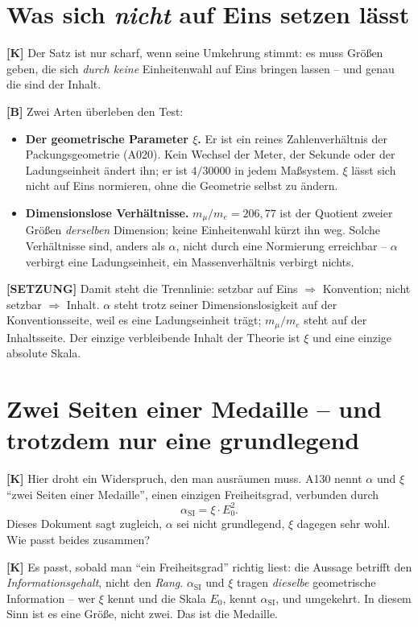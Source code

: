 \section{Was sich \emph{nicht} auf Eins setzen lässt}

\textbf{[K]} Der Satz ist nur scharf, wenn seine Umkehrung stimmt: es muss
Größen geben, die sich \emph{durch keine} Einheitenwahl auf Eins bringen lassen
-- und genau die sind der Inhalt.

\textbf{[B]} Zwei Arten überleben den Test:
\begin{itemize}
  \item \textbf{Der geometrische Parameter $\xi$.} Er ist ein reines
    Zahlenverhältnis der Packungsgeometrie (A020). Kein Wechsel der Meter, der
    Sekunde oder der Ladungseinheit ändert ihn; er ist $4/30000$ in jedem
    Maßsystem. $\xi$ lässt sich nicht auf Eins normieren, ohne die Geometrie
    selbst zu ändern.
  \item \textbf{Dimensionslose Verhältnisse.} $m_\mu/m_e = 206{,}77$ ist der
    Quotient zweier Größen \emph{derselben} Dimension; keine Einheitenwahl kürzt
    ihn weg. Solche Verhältnisse sind, anders als $\alpha$, nicht durch eine
    Normierung erreichbar -- $\alpha$ verbirgt eine Ladungseinheit, ein
    Massenverhältnis verbirgt nichts.
\end{itemize}

\textbf{[SETZUNG]} Damit steht die Trennlinie: setzbar auf Eins $\Rightarrow$
Konvention; nicht setzbar $\Rightarrow$ Inhalt. $\alpha$ steht trotz seiner
Dimensionslosigkeit auf der Konventionsseite, weil es eine Ladungseinheit trägt;
$m_\mu/m_e$ steht auf der Inhaltsseite. Der einzige verbleibende Inhalt der
Theorie ist $\xi$ und eine einzige absolute Skala.

\section{Zwei Seiten einer Medaille -- und trotzdem nur eine grundlegend}

\textbf{[K]} Hier droht ein Widerspruch, den man ausräumen muss. A130 nennt
$\alpha$ und $\xi$ \enquote{zwei Seiten einer Medaille}, einen einzigen
Freiheitsgrad, verbunden durch
\[
  \alpha_\text{SI} = \xi\cdot E_0^2 .
\]
Dieses Dokument sagt zugleich, $\alpha$ sei nicht grundlegend, $\xi$ dagegen
sehr wohl. Wie passt beides zusammen?

\textbf{[K]} Es passt, sobald man \enquote{ein Freiheitsgrad} richtig liest: die
Aussage betrifft den \emph{Informationsgehalt}, nicht den \emph{Rang}. $\alpha_\text{SI}$
und $\xi$ tragen \emph{dieselbe} geometrische Information -- wer $\xi$ kennt und
die Skala $E_0$, kennt $\alpha_\text{SI}$, und umgekehrt. In diesem Sinn ist es
eine Größe, nicht zwei. Das ist die Medaille.

